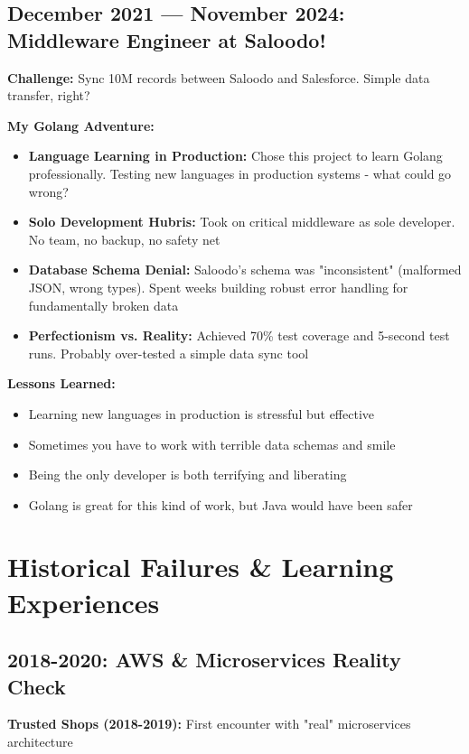 \documentclass[10pt,a4paper]{article}
\begin{document}
\subsection{December 2021 — November 2024: Middleware Engineer at Saloodo!}
\textbf{Challenge:} Sync 10M records between Saloodo and Salesforce. Simple data transfer, right?

\textbf{My Golang Adventure:}
\begin{itemize}[leftmargin=10pt,itemsep=1pt]
\item \textbf{Language Learning in Production:} Chose this project to learn Golang professionally. Testing new languages in production systems - what could go wrong?
\item \textbf{Solo Development Hubris:} Took on critical middleware as sole developer. No team, no backup, no safety net
\item \textbf{Database Schema Denial:} Saloodo's schema was "inconsistent" (malformed JSON, wrong types). Spent weeks building robust error handling for fundamentally broken data
\item \textbf{Perfectionism vs. Reality:} Achieved 70\% test coverage and 5-second test runs. Probably over-tested a simple data sync tool
\end{itemize}

\textbf{Lessons Learned:}
\begin{itemize}[leftmargin=10pt,itemsep=1pt]
\item Learning new languages in production is stressful but effective
\item Sometimes you have to work with terrible data schemas and smile
\item Being the only developer is both terrifying and liberating
\item Golang is great for this kind of work, but Java would have been safer
\end{itemize}

\section{Historical Failures \& Learning Experiences}

\subsection{2018-2020: AWS \& Microservices Reality Check}

\textbf{Trusted Shops (2018-2019):} First encounter with "real" microservices architecture
\end{document}
